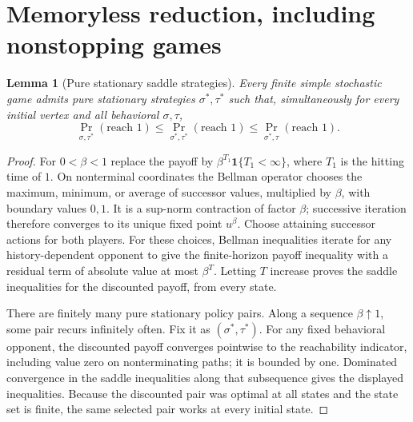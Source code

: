 \documentclass[11pt]{article}
\newtheorem{lemma}[theorem]{Lemma}
\theoremstyle{definition}
\begin{document}
\section{Memoryless reduction, including nonstopping games}
\begin{lemma}[Pure stationary saddle strategies]
Every finite simple stochastic game admits pure stationary strategies
$\sigma^*,\tau^*$ such that, simultaneously for every initial vertex and
all behavioral $\sigma,\tau$,
\[
 \Pr_{\sigma,\tau^*}(\text{reach }1)
 \leq \Pr_{\sigma^*,\tau^*}(\text{reach }1)
 \leq \Pr_{\sigma^*,\tau}(\text{reach }1).
\]
\end{lemma}
\begin{proof}
For $0<\beta<1$ replace the payoff by
$\beta^{T_1}\mathbf1\{T_1<\infty\}$, where $T_1$ is the hitting time of $1$.
On nonterminal coordinates the Bellman operator chooses the maximum, minimum,
or average of successor values, multiplied by $\beta$, with boundary values
$0,1$. It is a sup-norm contraction of factor $\beta$; successive iteration
therefore converges to its unique fixed point $u^\beta$.
Choose attaining successor actions for both players.
For these choices, Bellman inequalities iterate for any history-dependent
opponent to give the finite-horizon payoff inequality with a residual term
of absolute value at most $\beta^T$. Letting $T$ increase proves the saddle
inequalities for the discounted payoff, from every state.

There are finitely many pure stationary policy pairs. Along a sequence
$\beta\uparrow1$, some pair recurs infinitely often. Fix it as
$(\sigma^*,\tau^*)$. For any fixed behavioral opponent, the discounted
payoff converges pointwise to the reachability indicator, including value zero
on nonterminating paths; it is bounded by one. Dominated convergence in the
saddle inequalities along that subsequence gives the displayed inequalities.
Because the discounted pair was optimal at all states and the state set is
finite, the same selected pair works at every initial state.
\end{proof}
\end{document}

